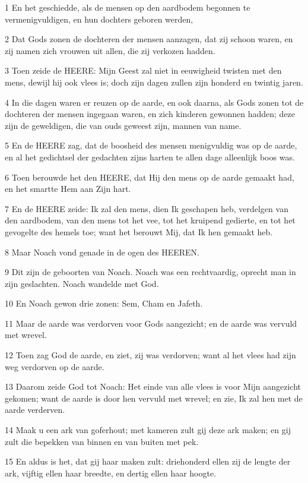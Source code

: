 \par 1 En het geschiedde, als de mensen op den aardbodem begonnen te vermenigvuldigen, en hun dochters geboren werden,
\par 2 Dat Gods zonen de dochteren der mensen aanzagen, dat zij schoon waren, en zij namen zich vrouwen uit allen, die zij verkozen hadden.
\par 3 Toen zeide de HEERE: Mijn Geest zal niet in eeuwigheid twisten met den mens, dewijl hij ook vlees is; doch zijn dagen zullen zijn honderd en twintig jaren.
\par 4 In die dagen waren er reuzen op de aarde, en ook daarna, als Gods zonen tot de dochteren der mensen ingegaan waren, en zich kinderen gewonnen hadden; deze zijn de geweldigen, die van ouds geweest zijn, mannen van name.
\par 5 En de HEERE zag, dat de boosheid des mensen menigvuldig was op de aarde, en al het gedichtsel der gedachten zijns harten te allen dage alleenlijk boos was.
\par 6 Toen berouwde het den HEERE, dat Hij den mens op de aarde gemaakt had, en het smartte Hem aan Zijn hart.
\par 7 En de HEERE zeide: Ik zal den mens, dien Ik geschapen heb, verdelgen van den aardbodem, van den mens tot het vee, tot het kruipend gedierte, en tot het gevogelte des hemels toe; want het berouwt Mij, dat Ik hen gemaakt heb.
\par 8 Maar Noach vond genade in de ogen des HEEREN.
\par 9 Dit zijn de geboorten van Noach. Noach was een rechtvaardig, oprecht man in zijn geslachten. Noach wandelde met God.
\par 10 En Noach gewon drie zonen: Sem, Cham en Jafeth.
\par 11 Maar de aarde was verdorven voor Gods aangezicht; en de aarde was vervuld met wrevel.
\par 12 Toen zag God de aarde, en ziet, zij was verdorven; want al het vlees had zijn weg verdorven op de aarde.
\par 13 Daarom zeide God tot Noach: Het einde van alle vlees is voor Mijn aangezicht gekomen; want de aarde is door hen vervuld met wrevel; en zie, Ik zal hen met de aarde verderven.
\par 14 Maak u een ark van goferhout; met kameren zult gij deze ark maken; en gij zult die bepekken van binnen en van buiten met pek.
\par 15 En aldus is het, dat gij haar maken zult: driehonderd ellen zij de lengte der ark, vijftig ellen haar breedte, en dertig ellen haar hoogte.
